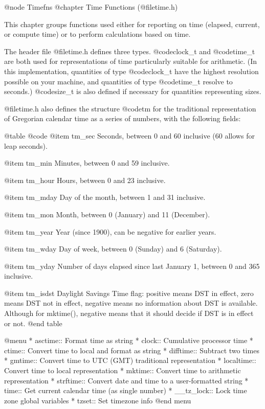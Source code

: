 @node Timefns
@chapter Time Functions (@file{time.h})

This chapter groups functions used either for reporting on time
(elapsed, current, or compute time) or to perform calculations based
on time.

The header file @file{time.h} defines three types.  @code{clock_t} and
@code{time_t} are both used for representations of time particularly
suitable for arithmetic.  (In this implementation, quantities of type
@code{clock_t} have the highest resolution possible on your machine,
and quantities of type @code{time_t} resolve to seconds.)  @code{size_t}
is also defined if necessary for quantities representing sizes. 

@file{time.h} also defines the structure @code{tm} for the traditional
representation of Gregorian calendar time as a series of numbers, with
the following fields: 

@table @code
@item tm_sec
Seconds, between 0 and 60 inclusive (60 allows for leap seconds).

@item tm_min
Minutes, between 0 and 59 inclusive.

@item tm_hour
Hours, between 0 and 23 inclusive.

@item tm_mday
Day of the month, between 1 and 31 inclusive.

@item tm_mon
Month, between 0 (January) and 11 (December).

@item tm_year
Year (since 1900), can be negative for earlier years.

@item tm_wday
Day of week, between 0 (Sunday) and 6 (Saturday).

@item tm_yday
Number of days elapsed since last January 1, between 0 and 365 inclusive.

@item tm_isdst
Daylight Savings Time flag: positive means DST in effect, zero means DST
not in effect, negative means no information about DST is available.
Although for mktime(), negative means that it should decide if DST is in
effect or not.
@end table

@menu
* asctime::     Format time as string
* clock::       Cumulative processor time
* ctime::       Convert time to local and format as string
* difftime::    Subtract two times
* gmtime::      Convert time to UTC (GMT) traditional representation
* localtime::   Convert time to local representation
* mktime::      Convert time to arithmetic representation
* strftime::    Convert date and time to a user-formatted string
* time::        Get current calendar time (as single number)
* __tz_lock::   Lock time zone global variables
* tzset::       Set timezone info
@end menu

